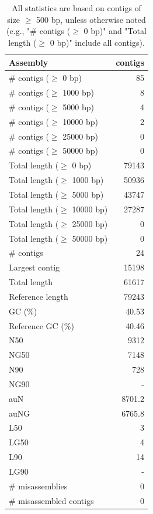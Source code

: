 \documentclass[12pt,a4paper]{article}
\begin{document}
\begin{table}[ht]
\begin{center}
\caption{All statistics are based on contigs of size $\geq$ 500 bp, unless otherwise noted (e.g., "\# contigs ($\geq$ 0 bp)" and "Total length ($\geq$ 0 bp)" include all contigs).}
\begin{tabular}{|l*{1}{|r}|}
\hline
Assembly & contigs \\ \hline
\# contigs ($\geq$ 0 bp) & 85 \\ \hline
\# contigs ($\geq$ 1000 bp) & 8 \\ \hline
\# contigs ($\geq$ 5000 bp) & 4 \\ \hline
\# contigs ($\geq$ 10000 bp) & 2 \\ \hline
\# contigs ($\geq$ 25000 bp) & 0 \\ \hline
\# contigs ($\geq$ 50000 bp) & 0 \\ \hline
Total length ($\geq$ 0 bp) & 79143 \\ \hline
Total length ($\geq$ 1000 bp) & 50936 \\ \hline
Total length ($\geq$ 5000 bp) & 43747 \\ \hline
Total length ($\geq$ 10000 bp) & 27287 \\ \hline
Total length ($\geq$ 25000 bp) & 0 \\ \hline
Total length ($\geq$ 50000 bp) & 0 \\ \hline
\# contigs & 24 \\ \hline
Largest contig & 15198 \\ \hline
Total length & 61617 \\ \hline
Reference length & 79243 \\ \hline
GC (\%) & 40.53 \\ \hline
Reference GC (\%) & 40.46 \\ \hline
N50 & 9312 \\ \hline
NG50 & 7148 \\ \hline
N90 & 728 \\ \hline
NG90 & - \\ \hline
auN & 8701.2 \\ \hline
auNG & 6765.8 \\ \hline
L50 & 3 \\ \hline
LG50 & 4 \\ \hline
L90 & 14 \\ \hline
LG90 & - \\ \hline
\# misassemblies & 0 \\ \hline
\# misassembled contigs & 0 \\ \hline

\end{tabular}
\end{center}
\end{table}
\end{document}
